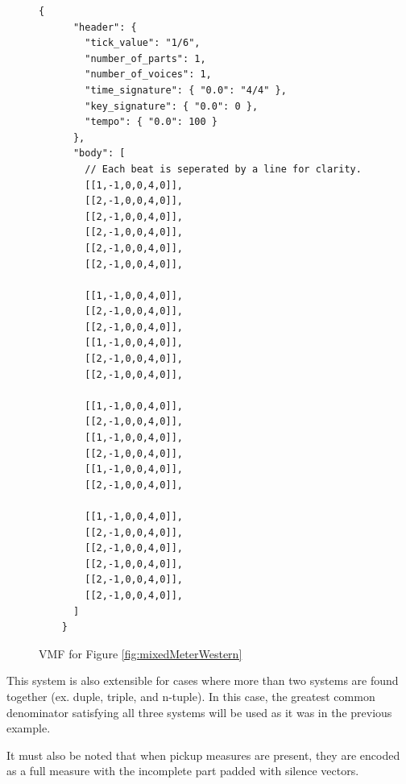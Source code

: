 \begin{figure}
  \begin{center}
    \begin{Verbatim}[fontfamily=courier, xleftmargin=\parindent]
    {
      "header": {
        "tick_value": "1/6",
        "number_of_parts": 1,
        "number_of_voices": 1,
        "time_signature": { "0.0": "4/4" },
        "key_signature": { "0.0": 0 },
        "tempo": { "0.0": 100 }
      },
      "body": [
        // Each beat is seperated by a line for clarity.
        [[1,-1,0,0,4,0]],
        [[2,-1,0,0,4,0]],
        [[2,-1,0,0,4,0]],
        [[2,-1,0,0,4,0]],
        [[2,-1,0,0,4,0]],
        [[2,-1,0,0,4,0]],

        [[1,-1,0,0,4,0]],
        [[2,-1,0,0,4,0]],
        [[2,-1,0,0,4,0]],
        [[1,-1,0,0,4,0]],
        [[2,-1,0,0,4,0]],
        [[2,-1,0,0,4,0]],

        [[1,-1,0,0,4,0]],
        [[2,-1,0,0,4,0]],
        [[1,-1,0,0,4,0]],
        [[2,-1,0,0,4,0]],
        [[1,-1,0,0,4,0]],
        [[2,-1,0,0,4,0]],

        [[1,-1,0,0,4,0]],
        [[2,-1,0,0,4,0]],
        [[2,-1,0,0,4,0]],
        [[2,-1,0,0,4,0]],
        [[2,-1,0,0,4,0]],
        [[2,-1,0,0,4,0]],
      ]
    }
    \end{Verbatim}
    \caption{VMF for Figure \ref{fig:mixedMeterWestern}}
    \label{fig:mixedMeterVMF}
  \end{center}
\end{figure}

This system is also extensible for cases where more than two systems are found together (ex. duple, triple, and n-tuple). In this case, the greatest common denominator satisfying all three systems will be used as it was in the previous example.

It must also be noted that when pickup measures are present, they are encoded as a full measure with the incomplete part padded with silence vectors.

